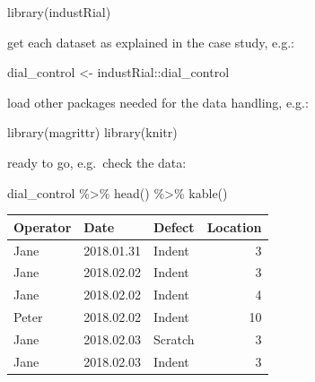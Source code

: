 \documentclass[
]{book}
\newenvironment{Shaded}{\begin{snugshade}}{\end{snugshade}}
\newcommand{\FunctionTok}[1]{\textcolor[rgb]{0.00,0.00,0.00}{#1}}
\newcommand{\NormalTok}[1]{#1}
\newcommand{\OtherTok}[1]{\textcolor[rgb]{0.56,0.35,0.01}{#1}}
\newcommand{\SpecialCharTok}[1]{\textcolor[rgb]{0.00,0.00,0.00}{#1}}
\begin{document}
\begin{Shaded}
\begin{Highlighting}[]
\FunctionTok{library}\NormalTok{(industRial)}
\end{Highlighting}
\end{Shaded}

get each dataset as explained in the case study, e.g.:

\begin{Shaded}
\begin{Highlighting}[]
\NormalTok{dial\_control }\OtherTok{\textless{}{-}}\NormalTok{  industRial}\SpecialCharTok{::}\NormalTok{dial\_control}
\end{Highlighting}
\end{Shaded}

load other packages needed for the data handling, e.g.:

\begin{Shaded}
\begin{Highlighting}[]
\FunctionTok{library}\NormalTok{(magrittr)}
\FunctionTok{library}\NormalTok{(knitr)}
\end{Highlighting}
\end{Shaded}

ready to go, e.g.~check the data:

\begin{Shaded}
\begin{Highlighting}[]
\NormalTok{dial\_control }\SpecialCharTok{\%\textgreater{}\%}
  \FunctionTok{head}\NormalTok{() }\SpecialCharTok{\%\textgreater{}\%}
  \FunctionTok{kable}\NormalTok{()}
\end{Highlighting}
\end{Shaded}

\begin{tabular}{l|l|l|r}
\hline
Operator & Date & Defect & Location\\
\hline
Jane & 2018.01.31 & Indent & 3\\
\hline
Jane & 2018.02.02 & Indent & 3\\
\hline
Jane & 2018.02.02 & Indent & 4\\
\hline
Peter & 2018.02.02 & Indent & 10\\
\hline
Jane & 2018.02.03 & Scratch & 3\\
\hline
Jane & 2018.02.03 & Indent & 3\\
\hline
\end{tabular}
\end{document}
